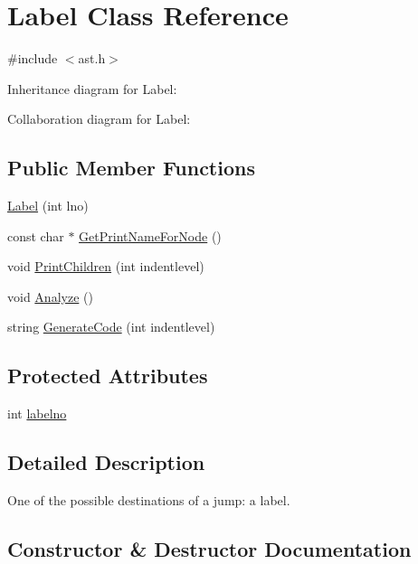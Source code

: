 \hypertarget{class_label}{}\section{Label Class Reference}
\label{class_label}


{\ttfamily \#include $<$ast.\+h$>$}



Inheritance diagram for Label\+:


Collaboration diagram for Label\+:
\subsection*{Public Member Functions}
\begin{DoxyCompactItemize}
\item 
\hyperlink{class_label_a6c7d6de28e23f8fbbd5ef36dccd14585}{Label} (int lno)
\item 
const char $\ast$ \hyperlink{class_label_a25ab9ad9a76ebf3011623a12925a8c2f}{Get\+Print\+Name\+For\+Node} ()
\item 
void \hyperlink{class_label_a7a7e823044ba97369dfe7cf5e860a4cd}{Print\+Children} (int indentlevel)
\item 
void \hyperlink{class_label_ae77a5d8983fc941f8289a8ba4e4b56c1}{Analyze} ()
\item 
string \hyperlink{class_label_aab044ceb8b6c2ea05ab19fd68a4911c2}{Generate\+Code} (int indentlevel)
\end{DoxyCompactItemize}
\subsection*{Protected Attributes}
\begin{DoxyCompactItemize}
\item 
int \hyperlink{class_label_a55c90cfdce54343d134203fb4922913b}{labelno}
\end{DoxyCompactItemize}


\subsection{Detailed Description}
One of the possible destinations of a jump\+: a label. 

\subsection{Constructor \& Destructor Documentation}
\mbox{\label{class_label_a6c7d6de28e23f8fbbd5ef36dccd14585}} 
